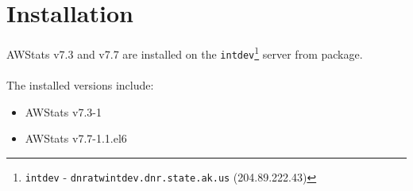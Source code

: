 
\newpage
\section{Installation}
AWStats v7.3 and v7.7 are installed on the
\texttt{intdev}\footnote{\texttt{intdev} - 
\texttt{dnratwintdev.dnr.state.ak.us} (204.89.222.43)} server from
package.\\
\\
\noindent The installed versions include:
\begin{itemize}
  \item AWStats v7.3-1
  \item AWStats v7.7-1.1.el6
\end{itemize}
